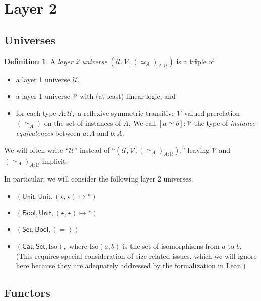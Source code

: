 \documentclass[a4paper]{article}
\theoremstyle{definition}
\newtheorem{definition}{Definition}[section]
\theoremstyle{remark}
\newcommand{\defn}{\emph}
\renewcommand{\equiv}{\simeq}
\newcommand{\U}{\mathcal{U}}
\newcommand{\V}{\mathcal{V}}
\newcommand{\nm}{\mathsf}
\newcommand{\universe}{\nm}
\newcommand{\Unit}{\universe{Unit}}
\newcommand{\Bool}{\universe{Bool}}
\newcommand{\Set}{\universe{Set}}
\newcommand{\Cat}{\universe{Cat}}
\newcommand{\Iso}{\mathrm{Iso}}
\begin{document}
\section{Layer 2}

\subsection{Universes}

\begin{definition}
  A \defn{layer 2 universe} $(\U,\V,(\equiv_A)_{A : \U})$ is a triple of
  \begin{itemize}
    \item a layer 1 universe $\U,$
    \item a layer 1 universe $\V$ with (at least) linear logic, and
    \item for each type $A : \U,$ a reflexive symmetric transitive $\V$-valued prerelation
    $(\equiv_A)$ on the set of instances of $A.$ We call $[a \equiv b] : \V$ the type of
    \defn{instance equivalences} between $a : A$ and $b : A.$
  \end{itemize}

  We will often write ``$\U$'' instead of ``$(\U,\V,(\equiv_A)_{A : \U})$,'' leaving $\V$ and
  $(\equiv_A)_{A : \U}$ implicit.
\end{definition}

In particular, we will consider the following layer 2 universes.
\begin{itemize}
  \item $(\Unit, \Unit, (\star,\star) \mapsto \ast)$
  \item $(\Bool, \Unit, (\star,\star) \mapsto \ast)$
  \item $(\Set, \Bool, (=))$
  \item $(\Cat, \Set, \Iso),$ where $\Iso(a,b)$ is the set of isomorphisms from $a$ to $b.$
  (This requires special consideration of size-related issues, which we will ignore here because
  they are adequately addressed by the formalization in Lean.)
\end{itemize}


\subsection{Functors}
\end{document}
